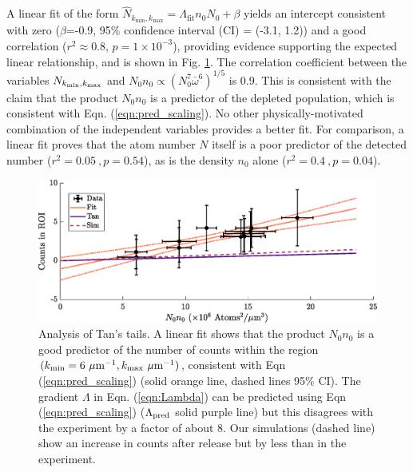 	A linear fit of the form $\hat{N}_{k_\textrm{min},k_\textrm{max}} = \Lambda_\textrm{fit} n_0 N_0 + \beta$ yields {an intercept} %
	consistent with zero ($\beta$=-0.9,  95\% confidence interval (CI) = (-3.1, 1.2)) and a good correlation ($r^2\approx0.8$, $p=1\times10^{-3}$), providing evidence supporting the expected linear relationship, and is shown in Fig. \ref{fig:exp_results}.
	The correlation coefficient between the %
	variables {$N_{k_{\rm min},k_{\rm max}}$} %
	and $N_0n_0\propto(N_0^7\bar{\omega}^6)^{1/5}$ is 0.9.
	This is consistent with the claim that the product $N_0n_0$ is a predictor of the depleted population, which is consistent with Eqn. (\ref{eqn:pred_scaling}).
	No other physically-motivated combination of the independent variables provides a better fit.
	For comparison, a linear fit proves that the atom number {$N$} itself is a poor predictor of the detected number ($r^2=0.05~,p=0.54$), as is the density {$n_0$} alone ($r^2=0.4~,p=0.04$).

		\begin{figure}
	\begin{center}
		\includegraphics[width=\columnwidth]{fig/QD/regression_results}
			\caption{{Analysis of Tan's tails.} A linear fit shows that the product $N_0n_0$ is a good predictor of the number of counts within the region $(k_\textrm{min}=6~\mu\textrm{m}^{-1},k_\textrm{max}~\mu\textrm{m}^{-1})$, consistent with Eqn (\ref{eqn:pred_scaling}) 
			(solid orange line, dashed lines 95\% CI). The gradient {$\Lambda$} %
			{in Eqn. (\ref{eqn:Lambda})} can be predicted using Eqn (\ref{eqn:pred_scaling}) ({$\Lambda_{\rm pred}$} solid purple line) but this disagrees with the experiment by a factor of about 8. Our simulations (dashed line) show an increase in counts after release but by less than in the experiment. 
			}

		\label{fig:exp_results}
	\end{center}
	\end{figure}


